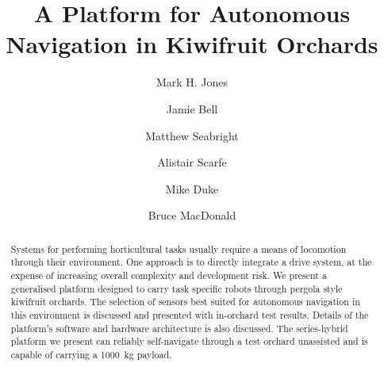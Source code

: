 \documentclass[preprint,authoryear,12pt]{elsarticle}
\begin{document}
\begin{frontmatter}



\title{A Platform for Autonomous Navigation in Kiwifruit Orchards}



\author[UoW]{Mark H. Jones}

\author[UoA]{Jamie Bell}
\author[UoW]{Matthew Seabright}
\author[RPL]{Alistair Scarfe}
\author[UoW]{Mike Duke}
\author[UoA]{Bruce MacDonald}

\address[UoW]{School of Engineering, University of Waikato, Hamilton, New Zealand}
\address[UoA]{Faculty of Engineering, University of Auckland, Auckland, New Zealand}
\address[RPL]{Robotics Plus Ltd, Newnham Innovation Park, Tauranga, New Zealand}

\begin{abstract}
    Systems for performing horticultural tasks usually require a means of locomotion through their environment.
    One approach is to directly integrate a drive system, at the expense of increasing overall complexity and development risk.
    We present a generalised platform designed to carry task specific robots through pergola style kiwifruit orchards.
    The selection of sensors best suited for autonomous navigation in this environment is discussed and presented with in-orchard test results.
    Details of the platform's software and hardware architecture is also discussed.
    The series-hybrid platform we present can reliably self-navigate through a test orchard unassisted and is capable of carrying a \SI{1000}{\kilo\gram} payload.
\end{abstract}


\end{frontmatter}
\end{document}
